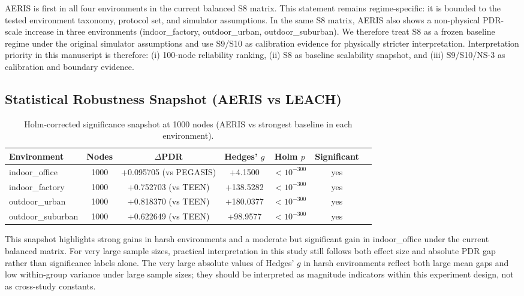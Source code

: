 \documentclass[sensors,article,submit,moreauthors,pdftex]{Definitions/mdpi}
\begin{document}
AERIS is first in all four environments in the current balanced S8 matrix. This statement remains regime-specific: it is bounded to the tested environment taxonomy, protocol set, and simulator assumptions.
In the same S8 matrix, AERIS also shows a non-physical PDR-scale increase in three environments (indoor\_factory, outdoor\_urban, outdoor\_suburban). We therefore treat S8 as a frozen baseline regime under the original simulator assumptions and use S9/S10 as calibration evidence for physically stricter interpretation.
Interpretation priority in this manuscript is therefore: (i) 100-node reliability ranking, (ii) S8 as baseline scalability snapshot, and (iii) S9/S10/NS-3 as calibration and boundary evidence.

\subsection{Statistical Robustness Snapshot (AERIS vs LEACH)}
\begin{table}[H]
\caption{Holm-corrected significance snapshot at 1000 nodes (AERIS vs strongest baseline in each environment).}
\label{tab:robust_snapshot}
\centering
\begin{tabular}{lcccccc}
\toprule
Environment & Nodes & $\Delta$PDR & Hedges' $g$ & Holm $p$ & Significant \\
\midrule
indoor\_office    & 1000 & +0.095705 (vs PEGASIS) & +4.1500 & $<10^{-300}$ & yes \\
indoor\_factory   & 1000 & +0.752703 (vs TEEN) & +138.5282 & $<10^{-300}$ & yes \\
outdoor\_urban    & 1000 & +0.818370 (vs TEEN) & +180.0377 & $<10^{-300}$ & yes \\
outdoor\_suburban & 1000 & +0.622649 (vs TEEN) & +98.9577 & $<10^{-300}$ & yes \\
\bottomrule
\end{tabular}
\end{table}

This snapshot highlights strong gains in harsh environments and a moderate but significant gain in indoor\_office under the current balanced matrix.
For very large sample sizes, practical interpretation in this study still follows both effect size and absolute PDR gap rather than significance labels alone.
The very large absolute values of Hedges' $g$ in harsh environments reflect both large mean gaps and low within-group variance under large sample sizes; they should be interpreted as magnitude indicators within this experiment design, not as cross-study constants.
\end{document}
